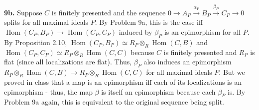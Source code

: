 \documentclass[11pt]{article}
\newcommand{\num}[1]{\noindent \textbf{#1}}
\newcommand{\Hom}{\operatorname{Hom}}
\theoremstyle{definition}
\begin{document}
\num{9b.} Suppose $C$ is finitely presented and the sequence $0\rightarrow
A_P\stackrel{\alpha_P}{\rightarrow}B_P\stackrel{\beta_P}{\rightarrow}C_P\rightarrow0$
splits for all maximal ideals $P$. By Problem 9a, this is the case iff
$\Hom(C_P,B_P)\rightarrow\Hom(C_P,C_P)$ induced by $\beta_P$ is an epimorphism
for all $P$. By Proposition 2.10, $\Hom(C_P,B_P)\simeq R_P\otimes_R\Hom(C,B)$
and $\Hom(C_P,C_P)\simeq R_P\otimes_R\Hom(C,C)$ because $C$ is finitely
presented and $R_P$ is flat (since all localizations are flat). Thus,
$\beta_P$ also induces an epimorphism $R_P\otimes_R\Hom(C,B)\rightarrow
R_P\otimes_R\Hom(C,C)$ for all maximal ideals $P$. But we proved in class
that a map is an epimorphism iff each of its localizations is an epimorphism -
thus, the map $\beta$ is itself an epimorphism because each $\beta_P$ is. By
Problem 9a again, this is equivalent to the original sequence being split.
\end{document}
